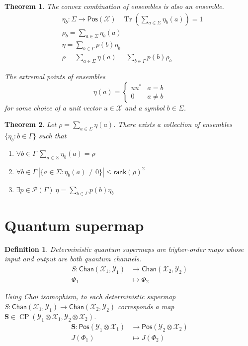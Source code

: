 \documentclass[aps,pra,onecolumn,notitlepage,superscriptaddress]{revtex4-1}
\newcommand{\spc}[1]{\mathcal{#1}}
\newcommand{\Pos}{\mathsf{Pos}}
\newcommand{\rank}{\mathsf{rank}}
\newcommand{\bs}[1]{\boldsymbol{#1}}
\newcommand{\Tr}{\operatorname{Tr}}
\newcommand{\op}[1]{\operatorname{#1}}
\newcommand{\Chan}{{\mathsf{Chan}}}
\newtheorem{theo}{Theorem}
\newtheorem{defi}{Definition}
\begin{document}
    \begin{theo}
        The convex combination of ensembles is also an ensemble.
        \begin{align}
            &\eta_b : \Sigma \to \Pos(\spc X) \ \ \ \ \Tr \left(\sum_{a \in \Sigma} \eta_b(a) \right) = 1 \\
            &\rho_b = \sum_{a \in \Sigma} \eta_b(a) \\
            &\eta = \sum_{b \in \Gamma} p(b)\eta_b \\
            &\rho = \sum_{a \in \Sigma} \eta(a) = \sum_{b \in \Gamma} p(b)\rho_b
        \end{align}

        The extremal points of ensembles
        \begin{equation}
            \eta(a) = \begin{cases}
                uu^* & a = b \\
                0 & a \neq b
            \end{cases}
        \end{equation}
        for some choice of a unit vector $u \in \spc X$ and a symbol $b \in \Sigma$.
    \end{theo}

    \begin{theo}
        Let $\rho = \sum_{a \in \Sigma} \eta(a)$. There exists a collection of ensembles $\{ \eta_b : b \in \Gamma \}$ such that
        \begin{enumerate}
            \item $\forall b \in \Gamma \ \sum_{a \in \Sigma} \eta_b(a) = \rho$
            \item $\forall b \in \Gamma \ |\{ a \in \Sigma : \eta_b(a) \neq 0 \}| \leq \rank(\rho)^2$
            \item $\exists p \in \spc P(\Gamma) \ \eta =  \sum_{b \in \Gamma} p(b)\eta_b$
        \end{enumerate}
    \end{theo}

    \section{Quantum supermap}
    \begin{defi}
        Deterministic quantum supermaps are higher-order maps whose input and output are both quantum channels. 
        \begin{align*}
            S : \Chan(\spc X_1, \spc Y_1) &\to \Chan(\spc X_2, \spc Y_2) \\
            \Phi_1 &\mapsto \Phi_2
        \end{align*}

        Using Choi isomophism, to each deterministic supermap $S : \Chan(\spc X_1, \spc Y_1) \to \Chan(\spc X_2, \spc Y_2)$ corresponds a map $\bs{S} \in \op{CP}(\spc Y_1 \otimes \spc X_1, \spc Y_2 \otimes \spc X_2)$.
        \begin{align*}
            \bs{S} : \Pos(\spc Y_1 \otimes \spc X_1) &\to \Pos(\spc Y_2 \otimes \spc X_2) \\
            J(\Phi_1) &\mapsto J(\Phi_2)
        \end{align*}
    \end{defi}
\end{document}
